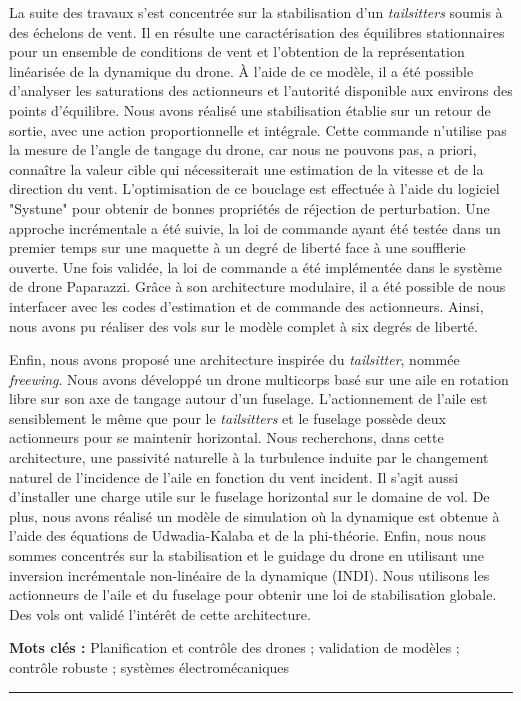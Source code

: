 \begin{vcenterpage}
La suite des travaux s'est concentrée sur la stabilisation d'un \textit{tailsitters} soumis à des échelons de vent. Il en résulte une caractérisation des équilibres stationnaires pour un ensemble de conditions de vent et l'obtention de la représentation linéarisée de la dynamique du drone. À l'aide de ce modèle, il a été possible d'analyser les saturations des actionneurs et l'autorité disponible aux environs des points d'équilibre. Nous avons réalisé une stabilisation établie sur un retour de sortie, avec une action proportionnelle et intégrale. Cette commande n'utilise pas la mesure de l'angle de tangage du drone, car nous ne pouvons pas, a priori, connaître la valeur cible qui nécessiterait une estimation de la vitesse et de la direction du vent. L'optimisation de ce bouclage est effectuée à l'aide du logiciel "Systune" pour obtenir de bonnes propriétés de réjection de perturbation. Une approche incrémentale a été suivie, la loi de commande ayant été testée dans un premier temps sur une maquette à un degré de liberté face à une soufflerie ouverte. Une fois validée, la loi de commande a été implémentée dans le système de drone Paparazzi. Grâce à son architecture modulaire, il a été possible de nous interfacer avec les codes d'estimation et de commande des actionneurs. Ainsi, nous avons pu réaliser des vols sur le modèle complet à six degrés de liberté.

Enfin, nous avons proposé une architecture inspirée du \textit{tailsitter}, nommée \textit{freewing}. Nous avons développé un drone multicorps basé sur une aile en rotation libre sur son axe de tangage autour d'un fuselage. L'actionnement de l'aile est sensiblement le même que pour le \textit{tailsitters} et le fuselage possède deux actionneurs pour se maintenir horizontal. Nous recherchons, dans cette architecture, une passivité naturelle à la turbulence induite par le changement naturel de l'incidence de l'aile en fonction du vent incident. Il s'agit aussi d'installer une charge utile sur le fuselage horizontal sur le domaine de vol. De plus, nous avons réalisé un modèle de simulation où la dynamique est obtenue à l'aide des équations de Udwadia-Kalaba et de la phi-théorie. Enfin, nous nous sommes concentrés sur la stabilisation et le guidage du drone en utilisant une inversion incrémentale non-linéaire de la dynamique (INDI). Nous utilisons les actionneurs de l'aile et du fuselage pour obtenir une loi de stabilisation globale. Des vols ont validé l'intérêt de cette architecture.

{\large\textbf{Mots clés :}}
Planification et contrôle des drones ; validation de modèles ; contrôle robuste ; systèmes électromécaniques

\noindent\rule[2pt]{\textwidth}{0.5pt}
\end{vcenterpage}

